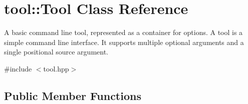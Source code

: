 \hypertarget{classtool_1_1Tool}{}\section{tool\+:\+:Tool Class Reference}
\label{classtool_1_1Tool}


A basic command line tool, represented as a container for options. A tool is a simple command line interface. It supports multiple optional arguments and a single positional source argument.  




{\ttfamily \#include $<$tool.\+hpp$>$}

\subsection*{Public Member Functions}
